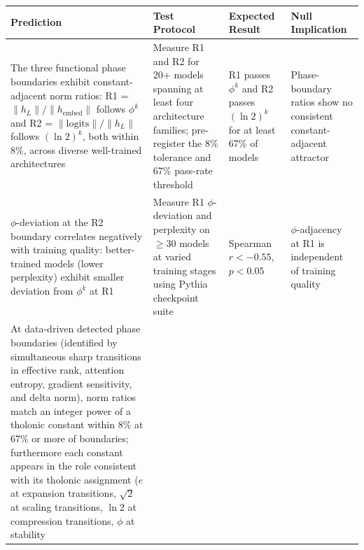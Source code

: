 \documentclass[
  11pt,
  letterpaper,
]{article}
\begin{document}
\begin{longtable}[]{@{}
  >{\raggedright\arraybackslash}p{}
  >{\raggedright\arraybackslash}p{}
  >{\raggedright\arraybackslash}p{}
  >{\raggedright\arraybackslash}p{}@{}}
\toprule\noalign{}
\begin{minipage}[b]{\linewidth}\raggedright
Prediction
\end{minipage} & \begin{minipage}[b]{\linewidth}\raggedright
Test Protocol
\end{minipage} & \begin{minipage}[b]{\linewidth}\raggedright
Expected Result
\end{minipage} & \begin{minipage}[b]{\linewidth}\raggedright
Null Implication
\end{minipage} \\
\midrule\noalign{}
\endhead
\bottomrule\noalign{}
\endlastfoot
The three functional phase boundaries exhibit constant-adjacent norm
ratios: R1 = \(\|h_L\|/\|h_{\text{embed}}\|\) follows \(\phi^k\) and R2
= \(\|\text{logits}\|/\|h_L\|\) follows \((\ln 2)^k\), both within 8\%,
across diverse well-trained architectures & Measure R1 and R2 for 20+
models spanning at least four architecture families; pre-register the
8\% tolerance and 67\% pass-rate threshold & R1 passes \(\phi^k\) and R2
passes \((\ln 2)^k\) for at least 67\% of models & Phase-boundary ratios
show no consistent constant-adjacent attractor \\
\(\phi\)-deviation at the R2 boundary correlates negatively with
training quality: better-trained models (lower perplexity) exhibit
smaller deviation from \(\phi^k\) at R1 & Measure R1 \(\phi\)-deviation
and perplexity on \(\geq 30\) models at varied training stages using
Pythia checkpoint suite & Spearman \(r < -0.55\), \(p < 0.05\) &
\(\phi\)-adjacency at R1 is independent of training quality \\
At data-driven detected phase boundaries (identified by simultaneous
sharp transitions in effective rank, attention entropy, gradient
sensitivity, and delta norm), norm ratios match an integer power of a
tholonic constant within 8\% at 67\% or more of boundaries; furthermore
each constant appears in the role consistent with its tholonic
assignment (\(e\) at expansion transitions, \(\sqrt{2}\) at scaling
transitions, \(\ln 2\) at compression transitions, \(\phi\) at stability

\end{longtable}
\end{document}
